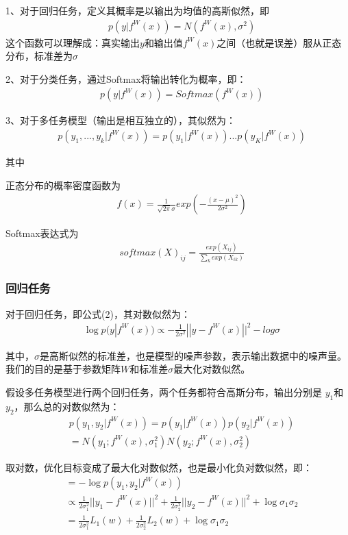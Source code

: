 1、对于回归任务，定义其概率是以输出为均值的高斯似然，即
\begin{align}
& p(y|f^W(x)) = N(f^W(x),\sigma^2)
\end{align}
这个函数可以理解成：真实输出$y$和输出值$f^W(x)$之间（也就是误差）服从正态分布，标准差为$\sigma$

2、对于分类任务，通过Softmax将输出转化为概率，即：
\begin{align}
& p(y|f^W(x)) = Softmax(f^W(x))
\end{align}

3、对于多任务模型（输出是相互独立的），其似然为：
\begin{align}
& p(y_1,...,y_k|f^W(x)) = p(y_1|f^W(x))...p(y_K|f^W(x))
\end{align}

其中

正态分布的概率密度函数为
\begin{align}
& f(x) = \frac{1}{\sqrt{2 \pi}\sigma}exp(-\frac{(x - \mu)^2}{2\sigma^2})
\end{align}

Softmax表达式为
\begin{align}
& softmax(X)_{ij} = \frac{exp(X_{ij})}{\sum_k exp(X_{ik})}
\end{align}

\subsubsection{回归任务}

对于回归任务，即公式(2)，其对数似然为：
\begin{align}
&\log p(y|f^W(x)) \propto - \frac{1}{2\sigma^2}||y - f^W(x)||^2 - log \sigma
\end{align}

其中，$\sigma$是高斯似然的标准差，也是模型的噪声参数，表示输出数据中的噪声量。我们的目的是基于参数矩阵$W$和标准差$\sigma$最大化对数似然。

假设多任务模型进行两个回归任务，两个任务都符合高斯分布，输出分别是 $y_1$和$y_2$，那么总的对数似然为：
\begin{align}
&p(y_1,y_2 | f^W(x)) = p(y_1|f^W(x))p(y_2|f^W(x)) \nonumber \\
&= N(y_1;f^W(x),\sigma^2_1)N(y_2;f^W(x),\sigma^2_2)
\end{align}

取对数，优化目标变成了最大化对数似然，也是最小化负对数似然，即：
\begin{align}
& = -\log p(y_1,y_2 | f^W(x)) \nonumber \\
&\propto \frac{1}{2\sigma^2_1}||y_1 - f^W(x)||^2 + \frac{1}{2\sigma^2_2}||y_2 - f^W(x)||^2 + \log \sigma_1 \sigma_2 \nonumber \\
& = \frac{1}{2\sigma^2_1}L_1(w) + \frac{1}{2\sigma^2_2}L_2(w) + \log \sigma_1 \sigma_2
\end{align}

